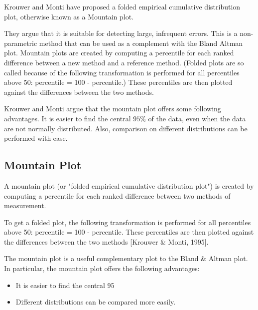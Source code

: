 \documentclass[Main.tex]{subfiles}
\begin{document}
Krouwer and Monti have proposed a folded empirical cumulative distribution plot, otherwise known as a Mountain plot.
	
They argue that it is suitable for detecting large, infrequent errors. This is a non-parametric method that can be used as a complement with the Bland Altman plot.  Mountain plots are created by computing a percentile for each ranked difference between a new method and a reference method. (Folded plots are so called because of the following transformation is performed for all percentiles above 50: percentile = 100 - percentile.) These percentiles are then plotted against the differences between the two methods.
	
Krouwer and Monti argue that the mountain plot offers some following advantages. It is easier to find the central $95\%$ of the data, even when the data are not normally distributed. Also, comparison on different distributions can be performed with ease.
	

\subsection*{Mountain Plot}
A mountain plot (or "folded empirical cumulative distribution plot") is created by computing a percentile for each ranked difference between two methods of measurement.

To get a folded plot, the following transformation is performed for all percentiles above 50: percentile = 100 - percentile. These percentiles are then plotted against the differences between the two methods [Krouwer \& Monti, 1995].

The mountain plot is a useful complementary plot to the Bland \& Altman plot. 
In particular, the mountain plot offers the following advantages:
\begin{itemize}
	\item It is easier to find the central 95%
	\item Different distributions can be compared more easily.
	
\end{itemize}


\end{document}
